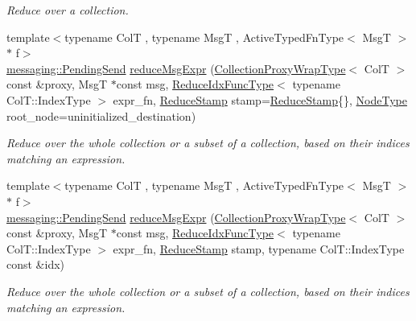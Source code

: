 \begin{DoxyCompactItemize}
\begin{DoxyCompactList}\small\item\em Reduce over a collection. \end{DoxyCompactList}\item 
{\footnotesize template$<$typename ColT , typename MsgT , Active\+Typed\+Fn\+Type$<$ Msg\+T $>$ $\ast$ f$>$ }\\\hyperlink{structvt_1_1messaging_1_1_pending_send}{messaging\+::\+Pending\+Send} \hyperlink{structvt_1_1vrt_1_1collection_1_1_collection_manager_a784c4fa10de6571dacfb587af3c90cb1}{reduce\+Msg\+Expr} (\hyperlink{structvt_1_1vrt_1_1collection_1_1_collection_manager_a56458ed7f9bb22b631b9b3a745f42f94}{Collection\+Proxy\+Wrap\+Type}$<$ ColT $>$ const \&proxy, MsgT $\ast$const msg, \hyperlink{structvt_1_1vrt_1_1collection_1_1_collection_manager_a47a3227ae0195c15187e8dc8762f66c4}{Reduce\+Idx\+Func\+Type}$<$ typename Col\+T\+::\+Index\+Type $>$ expr\+\_\+fn, \hyperlink{structvt_1_1vrt_1_1collection_1_1_collection_manager_ae8aac19e0ae07e9225142e5880eac830}{Reduce\+Stamp} stamp=\hyperlink{structvt_1_1vrt_1_1collection_1_1_collection_manager_ae8aac19e0ae07e9225142e5880eac830}{Reduce\+Stamp}\{\}, \hyperlink{namespacevt_a866da9d0efc19c0a1ce79e9e492f47e2}{Node\+Type} root\+\_\+node=uninitialized\+\_\+destination)
\begin{DoxyCompactList}\small\item\em Reduce over the whole collection or a subset of a collection, based on their indices matching an expression. \end{DoxyCompactList}\item 
{\footnotesize template$<$typename ColT , typename MsgT , Active\+Typed\+Fn\+Type$<$ Msg\+T $>$ $\ast$ f$>$ }\\\hyperlink{structvt_1_1messaging_1_1_pending_send}{messaging\+::\+Pending\+Send} \hyperlink{structvt_1_1vrt_1_1collection_1_1_collection_manager_ae05bc119a4986a39e957c1f8e93eb079}{reduce\+Msg\+Expr} (\hyperlink{structvt_1_1vrt_1_1collection_1_1_collection_manager_a56458ed7f9bb22b631b9b3a745f42f94}{Collection\+Proxy\+Wrap\+Type}$<$ ColT $>$ const \&proxy, MsgT $\ast$const msg, \hyperlink{structvt_1_1vrt_1_1collection_1_1_collection_manager_a47a3227ae0195c15187e8dc8762f66c4}{Reduce\+Idx\+Func\+Type}$<$ typename Col\+T\+::\+Index\+Type $>$ expr\+\_\+fn, \hyperlink{structvt_1_1vrt_1_1collection_1_1_collection_manager_ae8aac19e0ae07e9225142e5880eac830}{Reduce\+Stamp} stamp, typename Col\+T\+::\+Index\+Type const \&idx)
\begin{DoxyCompactList}\small\item\em Reduce over the whole collection or a subset of a collection, based on their indices matching an expression. \end{DoxyCompactList}\item 

\end{DoxyCompactItemize}
